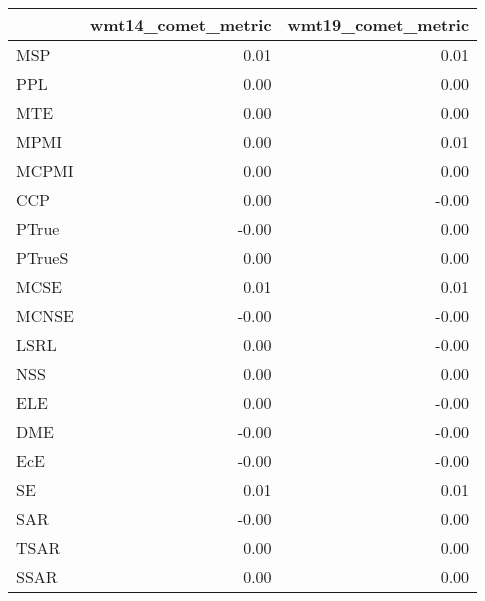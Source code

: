 \begin{tabular}{lrr}
\toprule
 & wmt14\_comet\_metric & wmt19\_comet\_metric \\
\midrule
MSP & 0.01 & 0.01 \\
PPL & 0.00 & 0.00 \\
MTE & 0.00 & 0.00 \\
MPMI & 0.00 & 0.01 \\
MCPMI & 0.00 & 0.00 \\
CCP & 0.00 & -0.00 \\
PTrue & -0.00 & 0.00 \\
PTrueS & 0.00 & 0.00 \\
MCSE & 0.01 & 0.01 \\
MCNSE & -0.00 & -0.00 \\
LSRL & 0.00 & -0.00 \\
NSS & 0.00 & 0.00 \\
ELE & 0.00 & -0.00 \\
DME & -0.00 & -0.00 \\
EcE & -0.00 & -0.00 \\
SE & 0.01 & 0.01 \\
SAR & -0.00 & 0.00 \\
TSAR & 0.00 & 0.00 \\
SSAR & 0.00 & 0.00 \\
\bottomrule
\end{tabular}
